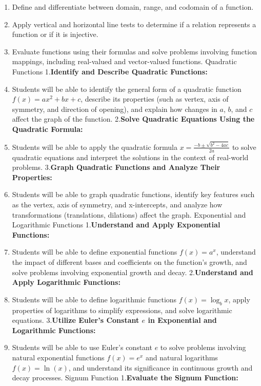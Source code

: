 \begin{enumerate}
    \item Define and differentiate between domain, range, and codomain of a function.
    \item Apply vertical and horizontal line tests to determine if a relation represents a function or if it is injective.
    \item Evaluate functions using their formulas and solve problems involving function mappings, including real-valued and vector-valued functions. Quadratic Functions 1.\textbf{Identify and Describe Quadratic Functions:}
    \item Students will be able to identify the general form of a quadratic function $f(x) = ax^2 + bx + c$, describe its properties (such as vertex, axis of symmetry, and direction of opening), and explain how changes in $a$, $b$, and $c$ affect the graph of the function. 2.\textbf{Solve Quadratic Equations Using the Quadratic Formula:}
    \item Students will be able to apply the quadratic formula $ x = \frac{-b \pm \sqrt{b^2 - 4ac}}{2a} $ to solve quadratic equations and interpret the solutions in the context of real-world problems. 3.\textbf{Graph Quadratic Functions and Analyze Their Properties:}
    \item Students will be able to graph quadratic functions, identify key features such as the vertex, axis of symmetry, and x-intercepts, and analyze how transformations (translations, dilations) affect the graph. Exponential and Logarithmic Functions 1.\textbf{Understand and Apply Exponential Functions:}
    \item Students will be able to define exponential functions $ f(x) = a^x $, understand the impact of different bases and coefficients on the function's growth, and solve problems involving exponential growth and decay. 2.\textbf{Understand and Apply Logarithmic Functions:}
    \item Students will be able to define logarithmic functions $ f(x) = \log_b x $, apply properties of logarithms to simplify expressions, and solve logarithmic equations. 3.\textbf{Utilize Euler’s Constant $ e $ in Exponential and Logarithmic Functions:}
    \item Students will be able to use Euler's constant $ e $ to solve problems involving natural exponential functions $ f(x) = e^x $ and natural logarithms $ f(x) = \ln(x) $, and understand its significance in continuous growth and decay processes. Signum Function 1.\textbf{Evaluate the Signum Function:}

\end{enumerate}
